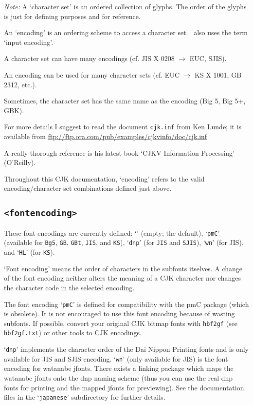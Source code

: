 \documentclass[a4paper, 11pt, draft]{article}
\begin{document}
\emph{Note:} A `character set' is an ordered collection of
glyphs. The order of the glyphs is just for
defining purposes and for reference.

An `encoding' is an ordering scheme to access a
character set. \LaTeXe\ also uses the term `input
encoding'.

A character set can have many encodings
(cf. JIS X 0208 $\to$ EUC, SJIS).

An encoding can be used for many character sets
(cf. EUC $\to$ KS X 1001, GB 2312, etc.).

Sometimes, the character set has the same name
as the encoding (Big 5, Big 5+, GBK).

For more details I suggest to read the document
\texttt{cjk.inf} from Ken Lunde; it is available from
\url{ftp://ftp.ora.com/pub/examples/cjkvinfo/doc/cjk.inf}

A really thorough reference is his latest book
`CJKV Information Processing' (O'Reilly).

Throughout this CJK documentation, `encoding'
refers to the valid encoding/character set
combinations defined just above.


\subsection{\texttt{<fontencoding>}}

These font encodings are currently defined: `' (empty;
the default), `\texttt{pmC}' (available for \texttt{Bg5}, \texttt{GB}, \texttt{GBt}, \texttt{JIS},
and \texttt{KS}), `\texttt{dnp}' (for \texttt{JIS} and \texttt{SJIS}), `\texttt{wn}' (for JIS), and
`\texttt{HL}' (for \texttt{KS}).

`Font encoding' means the order of characters in the
subfonts itselves. A change of the font encoding neither
alters the meaning of a CJK character nor changes the
character code in the selected encoding.

The font encoding `\texttt{pmC}' is defined for compatibility
with the \textsf{pmC} package (which is obsolete). It is not
encouraged to use this font encoding because of wasting
subfonts. If possible, convert your original CJK bitmap
fonts with \texttt{hbf2gf} (see \texttt{hbf2gf.txt}) or other tools to CJK
encodings.

`\texttt{dnp}' implements the character order of the Dai Nippon
Printing fonts and is only available for JIS and SJIS
encoding. `\texttt{wn}' (only available for JIS) is the font
encoding for watanabe jfonts. There exists a linking
package which maps the watanabe jfonts onto the dnp
naming scheme (thus you can use the real dnp fonts for
printing and the mapped jfonts for previewing). See the
documentation files in the `\texttt{japanese}' subdirectory for
further details.
\end{document}
